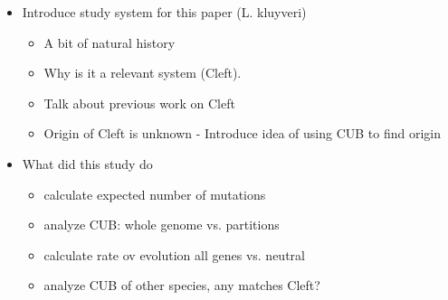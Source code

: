 \documentclass[12pt]{article}
\begin{document}
\begin{itemize}
\begin{itemize}
	\end{itemize}
	\item Introduce study system for this paper (L. kluyveri)
	\begin{itemize}
		\item A bit of natural history
		\item Why is it a relevant system (Cleft).
		\item Talk about previous work on Cleft
		\item Origin of Cleft is unknown - Introduce idea of using CUB to find origin
	\end{itemize}
	\item What did this study do
	\begin{itemize}
		\item calculate expected number of mutations
		\item analyze CUB: whole genome vs. partitions
		\item calculate rate ov evolution all genes vs. neutral
		\item analyze CUB of other species, any matches Cleft?
	\end{itemize}
\end{itemize}
\end{document}
